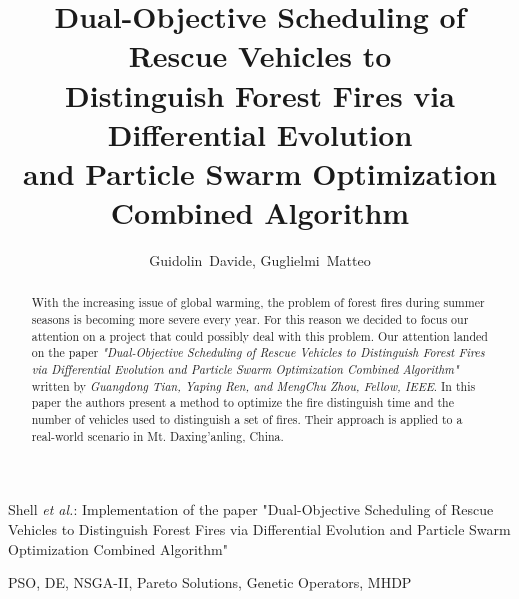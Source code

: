 \documentclass[journal]{IEEEtran}
\begin{document}
\title{Dual-Objective Scheduling of Rescue Vehicles to\\
Distinguish Forest Fires via Differential Evolution\\
and Particle Swarm Optimization\\
Combined Algorithm}

\author{Guidolin~Davide,
        Guglielmi~Matteo}%

%
{Shell \MakeLowercase{\textit{et al.}}: Implementation of the paper "Dual-Objective Scheduling of Rescue Vehicles to 
Distinguish Forest Fires via Differential Evolution
and Particle Swarm Optimization
Combined Algorithm"}
\maketitle

\begin{abstract}
With the increasing issue of global warming, the problem of forest fires during summer seasons is becoming more severe every year.
For this reason we decided to focus our attention on a project that could possibly deal with this problem. Our attention landed on the paper 
\textit{"Dual-Objective Scheduling of Rescue Vehicles to Distinguish Forest Fires via Differential Evolution and Particle Swarm Optimization Combined Algorithm"}
written by \textit{Guangdong Tian, Yaping Ren, and MengChu Zhou, Fellow, IEEE}. 
In this paper the authors present a method to optimize the fire distinguish time and the number of vehicles used to distinguish a set of fires.
Their approach is applied to a real-world scenario in Mt. Daxing’anling, China.
\end{abstract}

\begin{IEEEkeywords}
    PSO, DE, NSGA-II, Pareto Solutions, Genetic Operators, MHDP
\end{IEEEkeywords}

\IEEEpeerreviewmaketitle


\end{document}

